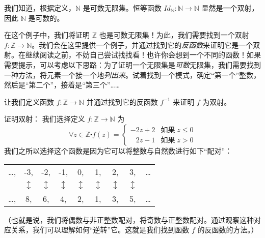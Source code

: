 \begin{example}\label{ex:example7.6.12}

    我们知道，根据定义，$\mathbb{N}$ 是可数无限集。恒等函数 $Id_{\mathbb{N}} : \mathbb{N} \to \mathbb{N}$ 显然是一个双射，因此 $\mathbb{N}$ 是可数的。

    在这个例子中，我们将证明 $\mathbb{Z}$ 也是可数无限集！为此，我们需要找到一个双射 $f : \mathbb{Z} \to \mathbb{N}$。我们会在这里提供一个例子，并通过找到它的\emph{反函数}来证明它是一个双射。在继续阅读之前，不妨自己尝试找找看！也许你会想到一个不同的函数！如果需要提示，可以考虑以下思路：为了证明一个无限集是\emph{可数}无限集，我们需要找到一种方法，将元素一个接一个地\emph{列出来}。试着找到一个模式，确定``第一个''整数，然后是``第二个''，接着是``第三个''……

    让我们定义函数 $f : \mathbb{Z} \to \mathbb{N}$ 并通过找到它的反函数 $f^{-1}$ 来证明 $f$ 为双射。

    \begin{proofs}{证明双射：}
        我们选择定义 $f : \mathbb{Z} \to \mathbb{N}$ 为
        \[\forall z \in \mathbb{Z} \centerdot f(z) = \begin{cases}
                -2z + 2          & \text{如果}\; z \le 0 \\
                \enspace\; 2z -1 & \text{如果}\; z > 0
            \end{cases}\]
        我们之所以选择这个函数是因为它可以将整数与自然数进行如下``配对''：
        \begin{center}
            \begin{tabular}{ccccccccc}
                \dots , & -3,            & -2,            & -1,            & 0,             & 1,             & 2,             & 3,             & \dots \\
                        & $\updownarrow$ & $\updownarrow$ & $\updownarrow$ & $\updownarrow$ & $\updownarrow$ & $\updownarrow$ & $\updownarrow$ &       \\
                \dots , & 8,             & 6,             & 4,             & 2,             & 1,             & 3,             & 5,             & \dots
            \end{tabular}
        \end{center}
        （也就是说，我们将偶数与非正整数配对，将奇数与正整数配对。通过观察这种对应关系，我们可以理解如何``逆转''它。这就是我们找到函数 $f$ 的反函数的方法。）


\end{proofs}
\end{example}
